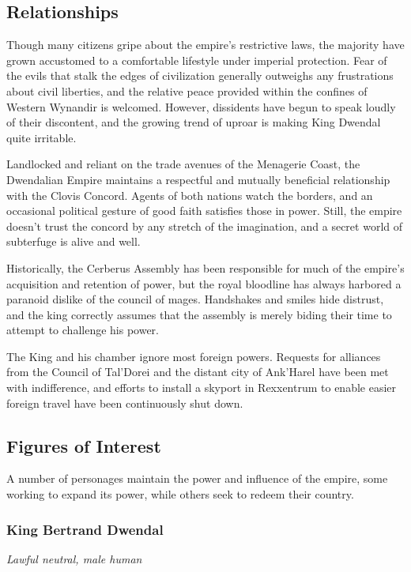 \documentclass[10pt,a4paper,twoside,bg=print,twocolumn,openany,nodeprecatedcode]{dndbook}
\begin{document}
\subsection{Relationships}
Though many citizens gripe about the empire's restrictive laws, the majority have grown accustomed to a comfortable lifestyle under imperial protection. Fear of the evils that stalk the edges of civilization generally outweighs any frustrations about civil liberties, and the relative peace provided within the confines of Western Wynandir is welcomed. However, dissidents have begun to speak loudly of their discontent, and the growing trend of uproar is making King Dwendal quite irritable.

Landlocked and reliant on the trade avenues of the Menagerie Coast, the Dwendalian Empire maintains a respectful and mutually beneficial relationship with the Clovis Concord. Agents of both nations watch the borders, and an occasional political gesture of good faith satisfies those in power. Still, the empire doesn't trust the concord by any stretch of the imagination, and a secret world of subterfuge is alive and well.

Historically, the Cerberus Assembly has been responsible for much of the empire's acquisition and retention of power, but the royal bloodline has always harbored a paranoid dislike of the council of mages. Handshakes and smiles hide distrust, and the king correctly assumes that the assembly is merely biding their time to attempt to challenge his power.

The King and his chamber ignore most foreign powers. Requests for alliances from the Council of Tal'Dorei and the distant city of Ank'Harel have been met with indifference, and efforts to install a skyport in Rexxentrum to enable easier foreign travel have been continuously shut down.

\subsection{Figures of Interest}
A number of personages maintain the power and influence of the empire, some working to expand its power, while others seek to redeem their country.

\subsubsection{King Bertrand Dwendal}
\textit{Lawful neutral, male human}
\end{document}
